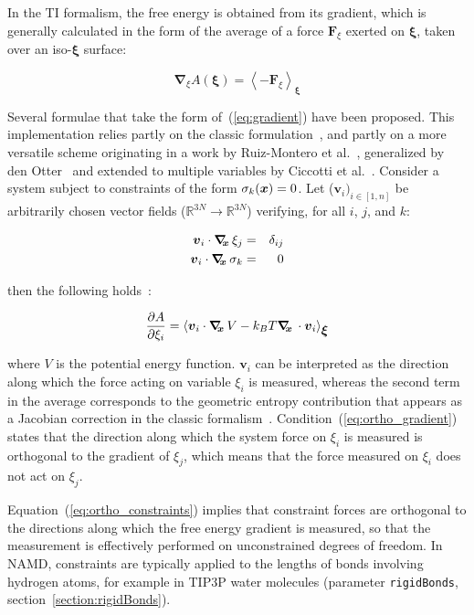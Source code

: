 In the TI formalism, the free energy is obtained from its gradient, 
which is generally calculated in the form of the average of a force
$\bm{F}_\xi$ exerted on $\bm{\xi}$, taken over an iso-$\bm{\xi}$ surface:

\begin{equation}
  \label{eq:gradient}
  \bm{\nabla}_\xi A(\bm{\xi}) = \left\langle -\bm{F}_\xi \right\rangle_\bm{\xi}
\end{equation}

Several formulae that take the form of~(\ref{eq:gradient}) have been
proposed.  This implementation relies partly on the classic
formulation~\cite{Carter1989}, and partly on a more versatile scheme
originating in a work by Ruiz-Montero et al.~\cite{Ruiz-Montero1997},
generalized by den Otter~\cite{denOtter2000} and extended to multiple
variables by Ciccotti et al.~\cite{Ciccotti2005}.  Consider a system
subject to constraints of the form $\sigma_{k}({\mbox{\boldmath{$x$}}}) = 0$.  Let
($\bm{v}_{i})_{i\in[1,n]}$ be arbitrarily chosen vector fields
($\mathbb{R}^{3N}\rightarrow\mathbb{R}^{3N}$) verifying, for all $i$,
$j$, and $k$:

\begin{eqnarray}
\label{eq:ortho_gradient}
{\mbox{\boldmath{$v$}}}_{i} \cdot \mbox{\boldmath$\nabla_{\!\!x}\,$} \xi_{j}    & = & \delta_{ij}\\
\label{eq:ortho_constraints}
{\mbox{\boldmath{$v$}}}_{i} \cdot \mbox{\boldmath$\nabla_{\!\!x}\,$} \sigma_{k} & = & 0
\end{eqnarray}

then the following holds~\cite{Ciccotti2005}:

\begin{equation}
\label{eq:gradient_vector}
\frac{\partial A}{\partial \xi_{i}} = \left\langle {\mbox{\boldmath{$v$}}}_{i} \cdot \mbox{\boldmath$\nabla_{\!\!x}\,$} V
- k_B T \mbox{\boldmath$\nabla_{\!\!x}\,$} \cdot {\mbox{\boldmath{$v$}}}_{i} \right\rangle_{\mbox{\boldmath{$\xi$}}}
\end{equation}

where $V$ is the potential energy function.
$\bm{v}_{i}$ can be interpreted as the direction along which the force
acting on variable $\xi_{i}$ is measured, whereas the second term in the
average corresponds to the geometric entropy contribution that appears
as a Jacobian correction in the classic formalism~\cite{Carter1989}.
Condition~(\ref{eq:ortho_gradient}) states that the direction along
which the system force on $\xi_{i}$ is measured is orthogonal to the
gradient of $\xi_{j}$, which means that the force measured on $\xi_{i}$
does not act on $\xi_{j}$.

Equation~(\ref{eq:ortho_constraints}) implies that constraint forces
are orthogonal to the directions along which the free energy gradient is
measured, so that the measurement is effectively performed on unconstrained
degrees of freedom. In NAMD, constraints are typically applied to the lengths of
bonds involving hydrogen atoms, for example in TIP3P water molecules
(parameter \texttt{rigidBonds}, section~\ref{section:rigidBonds}).


